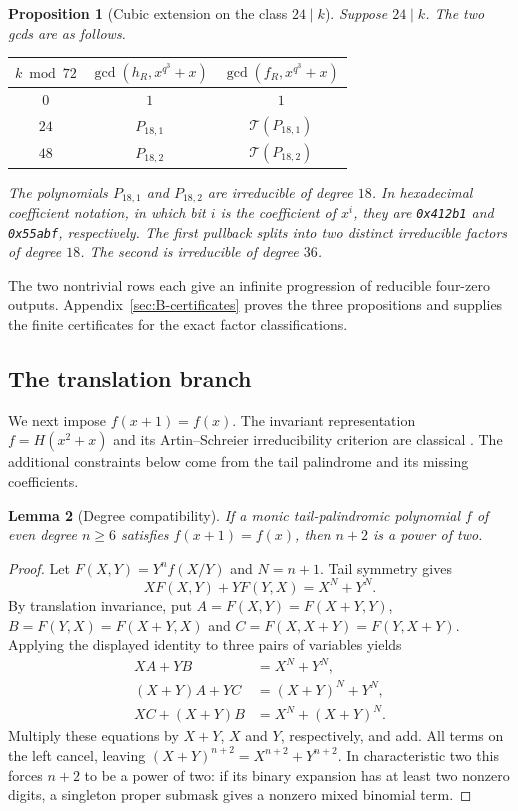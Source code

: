 \documentclass[11pt]{article}
\newtheorem{proposition}{Proposition}[section]
\newtheorem{lemma}[proposition]{Lemma}
\theoremstyle{definition}
\theoremstyle{remark}
\begin{document}
\begin{proposition}[Cubic extension on the class $24\mid k$]
\label{prop:B-cubic-extension}
Suppose $24\mid k$. The two gcds are as follows.
\begin{center}
\begin{tabular}{@{}ccc@{}}
\toprule
$k\bmod 72$ & $\gcd(h_R,x^{q^3}+x)$ & $\gcd(f_R,x^{q^3}+x)$\\
\midrule
$0$  & $1$ & $1$\\
$24$ & $P_{18,1}$ & $\mathcal T(P_{18,1})$\\
$48$ & $P_{18,2}$ & $\mathcal T(P_{18,2})$\\
\bottomrule
\end{tabular}
\end{center}
The polynomials $P_{18,1}$ and $P_{18,2}$ are irreducible of
degree $18$. In hexadecimal coefficient notation, in which bit $i$
is the coefficient of $x^i$, they are \textup{\texttt{0x412b1}} and
\textup{\texttt{0x55abf}}, respectively. The first pullback splits into two
distinct irreducible factors of degree $18$. The second is irreducible
of degree $36$.
\end{proposition}

The two nontrivial rows each give an infinite progression of reducible
four-zero outputs. Appendix~\ref{sec:B-certificates} proves the three
propositions and supplies the finite certificates for the exact
factor classifications.

\subsection{The translation branch}\label{sec:translation}
We next impose $f(x+1)=f(x)$. The invariant representation
$f=H(x^2+x)$ and its Artin--Schreier irreducibility criterion are
classical \cite[Lemma 2.1 and Theorem 2.2]{Kap17}. The additional
constraints below come from the tail palindrome and its missing
coefficients.

\begin{lemma}[Degree compatibility]\label{lem:translation-degree}
If a monic tail-palindromic polynomial $f$ of even degree $n\ge6$
satisfies $f(x+1)=f(x)$, then $n+2$ is a power of two.
\end{lemma}
\begin{proof}
Let $F(X,Y)=Y^nf(X/Y)$ and $N=n+1$. Tail symmetry gives
\[
 XF(X,Y)+YF(Y,X)=X^N+Y^N.
\]
By translation invariance, put
$A=F(X,Y)=F(X+Y,Y)$, $B=F(Y,X)=F(X+Y,X)$ and
$C=F(X,X+Y)=F(Y,X+Y)$. Applying the displayed identity to
three pairs of variables yields
\[
\begin{aligned}
 XA+YB&=X^N+Y^N,\\
 (X+Y)A+YC&=(X+Y)^N+Y^N,\\
 XC+(X+Y)B&=X^N+(X+Y)^N.
\end{aligned}
\]
Multiply these equations by $X+Y$, $X$ and $Y$, respectively,
and add. All terms on the left cancel, leaving
$(X+Y)^{n+2}=X^{n+2}+Y^{n+2}$. In characteristic two this
forces $n+2$ to be a power of two: if its binary expansion has
at least two nonzero digits, a singleton proper submask gives
a nonzero mixed binomial term.
\end{proof}
\end{document}
